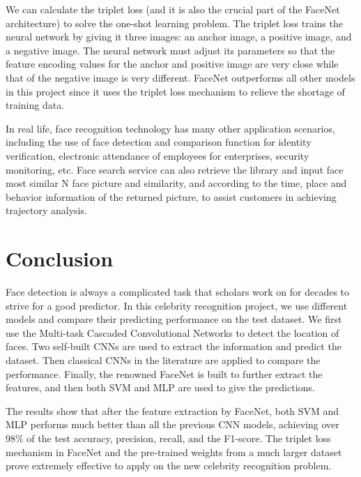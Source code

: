 We can calculate the triplet loss (and it is also the crucial part of the FaceNet architecture) to solve the one-shot learning problem. The triplet loss trains the neural network by giving it three images: an anchor image, a positive image, and a negative image. The neural network must adjust its parameters so that the feature encoding values for the anchor and positive image are very close while that of the negative image is very different. FaceNet outperforms all other models in this project since it uses the triplet loss mechanism to relieve the shortage of training data. 

In real life, face recognition technology has many other application scenarios, including the use of face detection and comparison function for identity verification, electronic attendance of employees for enterprises, security monitoring, etc. Face search service can also retrieve the library and input face most similar N face picture and similarity, and according to the time, place and behavior information of the returned picture, to assist customers in achieving trajectory analysis.

\section{Conclusion}
Face detection is always a complicated task that scholars work on for decades to strive for a good predictor. In this celebrity recognition project, we use different models and compare their predicting performance on the test dataset. We first use the Multi-task Cascaded Convolutional Networks to detect the location of faces. Two self-built CNNs are used to extract the information and predict the dataset. Then classical CNNs in the literature are applied to compare the performance. Finally, the renowned FaceNet is built to further extract the features, and then both SVM and MLP are used to give the predictions. 

The results show that after the feature extraction by FaceNet, both SVM and MLP performs much better than all the previous CNN models, achieving over 98\% of the test accuracy, precision, recall, and the F1-score. The triplet loss mechanism in FaceNet and the pre-trained weights from a much larger dataset prove extremely effective to apply on the new celebrity recognition problem.



\newpage













